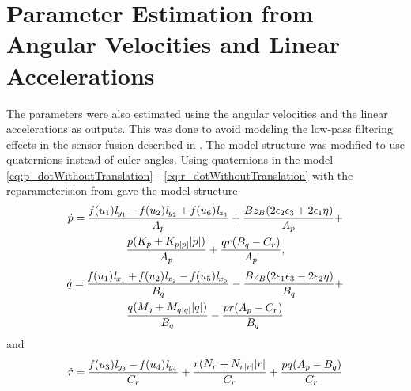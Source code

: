 \section{Parameter Estimation from Angular Velocities and Linear Accelerations} \label{sec:angLinEstim}
The parameters were also estimated using the angular velocities and the linear accelerations as outputs. This was done to avoid modeling the low-pass filtering effects in the sensor fusion described in . The model structure was modified to use quaternions instead of euler angles. Using quaternions in the model \eqref{eq:p_dotWithoutTranslation} - \eqref{eq:r_dotWithoutTranslation} with the reparameterision from  gave the model structure 
\begin{multline}
\dot{p} = \frac{\mathit{f}(u_{1}) \mathit{l}_{y_{1}} - \mathit{f}(u_{2}) \mathit{l}_{y_{2}} + \mathit{f}(u_{6}) \mathit{l}_{z_{6}}}{A_p} + \frac{B z_B (2 \epsilon_2 \epsilon_3 + 2 \epsilon_1 \eta)}{A_p} + \\ \frac{p (K_{p} + K_{p|p|} |p|)}{A_p} + \frac{q r (B_q - C_r)}{A_p},
\end{multline}
\begin{multline}
\dot{q} = \frac{\mathit{f}(u_{1}) \mathit{l}_{x_{1}} + \mathit{f}(u_{2}) \mathit{l}_{x_{2}} - \mathit{f}(u_{5}) \mathit{l}_{x_{5}}}{B_q} - \frac{B z_B (2 \epsilon_1 \epsilon_3 - 2 \epsilon_2 \eta)}{B_q} + \\ \frac{q (M_{q} + M_{q|q|} |q|)}{B_q} - \frac{p r (A_p - C_r)}{B_q}
\end{multline}
and
\begin{multline}
\dot{r} = \frac{\mathit{f}(u_{3}) \mathit{l}_{y_{3}} - \mathit{f}(u_{4}) \mathit{l}_{y_{4}}}{C_r} + \frac{r (N_{r} + N_{r|r|} |r|}{C_r} + \frac{p q (A_p  - B_q)}{C_r}
\end{multline}

